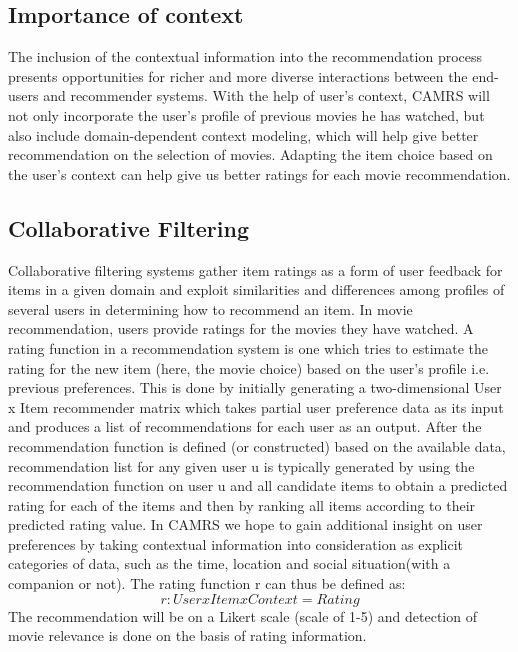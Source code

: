 \documentclass{article}
\begin{document}
\subsection{Importance of context} 
The inclusion of the contextual information into the recommendation process presents opportunities for richer and more diverse interactions between the end-users and recommender systems. With the help of user's context, CAMRS will not only incorporate the user's profile of previous movies he has watched, but also include domain-dependent context modeling, which will help give better recommendation on the selection of movies.  Adapting the item choice based on the user's context can help give us better ratings for each movie recommendation.

\subsection{Collaborative Filtering}
Collaborative filtering systems gather item ratings as a form of user feedback for items in a given domain and exploit similarities and differences among profiles of several users in determining how to recommend an item. In movie recommendation, users provide ratings for the movies they have watched. 
A rating function in a recommendation system is one which tries to estimate the rating for the new item (here, the movie choice) based on the user's profile i.e. previous preferences.
This is done by initially generating a two-dimensional User x Item recommender matrix which takes partial user preference data as its input and produces a list of recommendations for each user as an output.
After the recommendation function is defined (or constructed) based on the available data, recommendation list for any given user u is typically generated by using the recommendation function on user u and all candidate items to obtain a predicted rating for each of the items and then by ranking all items according to their predicted rating value.
In CAMRS we hope to gain additional insight on user preferences by taking contextual information into consideration as explicit categories of data, such as the time, location and social situation(with a companion or not). The rating function r can thus be defined as: 
\begin{equation}r: User x Item x Context = Rating 
\end{equation}
The recommendation will be on a Likert scale (scale of 1-5) and detection of movie relevance is done on the basis of rating information. 
\end{document}
